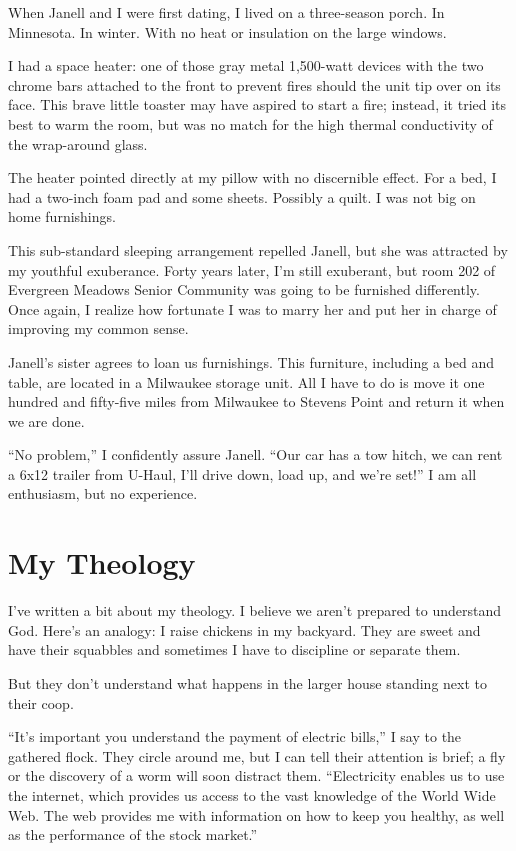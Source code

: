 \documentclass[
  letterpaper,
  DIV=11,
  numbers=noendperiod]{scrreprt}
\begin{document}

When Janell and I were first dating, I lived on a three-season porch. In
Minnesota. In winter. With no heat or insulation on the large windows.

I had a space heater: one of those gray metal 1,500-watt devices with
the two chrome bars attached to the front to prevent fires should the
unit tip over on its face. This brave little toaster may have aspired to
start a fire; instead, it tried its best to warm the room, but was no
match for the high thermal conductivity of the wrap-around glass.

The heater pointed directly at my pillow with no discernible effect. For
a bed, I had a two-inch foam pad and some sheets. Possibly a quilt. I
was not big on home furnishings.

This sub-standard sleeping arrangement repelled Janell, but she was
attracted by my youthful exuberance. Forty years later, I'm still
exuberant, but room 202 of Evergreen Meadows Senior Community was going
to be furnished differently. Once again, I realize how fortunate I was
to marry her and put her in charge of improving my common sense.

Janell's sister agrees to loan us furnishings. This furniture, including
a bed and table, are located in a Milwaukee storage unit. All I have to
do is move it one hundred and fifty-five miles from Milwaukee to Stevens
Point and return it when we are done.

``No problem,'' I confidently assure Janell. ``Our car has a tow hitch,
we can rent a 6x12 trailer from U-Haul, I'll drive down, load up, and
we're set!'' I am all enthusiasm, but no experience.

\section*{My Theology}\label{my-theology}


I've written a bit about my theology. I believe we aren't prepared to
understand God. Here's an analogy: I raise chickens in my backyard. They
are sweet and have their squabbles and sometimes I have to discipline or
separate them.

But they don't understand what happens in the larger house standing next
to their coop.

``It's important you understand the payment of electric bills,'' I say
to the gathered flock. They circle around me, but I can tell their
attention is brief; a fly or the discovery of a worm will soon distract
them. ``Electricity enables us to use the internet, which provides us
access to the vast knowledge of the World Wide Web. The web provides me
with information on how to keep you healthy, as well as the performance
of the stock market.''
\end{document}
